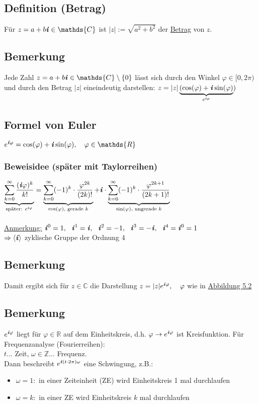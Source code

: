 \documentclass[a4paper, 12pt,titlepage, pdf, headsepline]{scrartcl}
\newcommand{\R}{\mathds{R}}
\newcommand{\Z}{\mathds{Z}}
\newcommand{\C}{\mathds{C}}
\newcommand{\uline}[1]{\underline{#1}}
\renewcommand{\i}{\textbf{\textit{i}}}
\renewcommand{\>}{\rightarrow}
\renewcommand{\*}{\cdot}
\renewcommand{\phi}{\varphi}
\begin{document}
		      		\subsection{Definition (Betrag)}
		      		Für $z = a+b\i \in \C$ ist $|z| := \sqrt{a^2 + b^2}$ der \uline{Betrag} von $z$.
		      		\subsection{Bemerkung}
		      		Jede Zahl $z = a+b\i \in \C \setminus \{0\} $ lässt sich durch den Winkel $\phi \in [0,2\pi)$ und durch den Betrag $|z|$ eineindeutig darstellen: 
		      			$z = |z|\underbrace{(\cos(\phi) + \i \sin(\phi)}_{e^{\i\phi}})$
		      			\subsection{Formel von Euler}
		      			\label{5.5}
		      			$e^{\i\phi} = \cos(\phi) + \i \sin(\phi),~~~ \phi \in \R$
		      			\subsubsection*{Beweisidee (später mit Taylorreihen)}
		      			$\underbrace{\sum_{k = 0}^{\infty} \frac{(\i\phi)^k}{k!}}_{\text{später: }e^{\i\phi}} = \underbrace{\sum_{k = 0}^{\infty}(-1)^k \cdot \frac{\phi^{2k}}{(2k)!}}_{\cos(\phi)\textrm{, gerade }k} + \i \cdot \underbrace{ \sum_{k = 0}^{\infty}(-1)^k \cdot \frac{\phi^{2k+1}}{(2k+1)!}}_{\sin(\phi)\textrm{, ungerade }k}$\\
		      			\\
		      			\uline{Anmerkung:} $\i^0 = 1,~~ \i^1 = \i,~~ \i^2 = -1,~~ \i^3 = -\i,~~ \i^4 = \i^0 = 1$\\
		      			$\Rightarrow \langle \i \rangle$ zyklische Gruppe der Ordnung 4
		      			\subsection{Bemerkung}
		      			Damit ergibt sich für $z \in \C$ die Darstellung $z = |z| e^{\i\phi},~~~ \phi$ wie in \hyperref[5.2]{Abbildung 5.2}
		      			\subsection{Bemerkung}
		      			$e^{\i\phi}$ liegt für $\phi \in \R$ auf dem Einheitskreis, d.h. $\phi \rightarrow e^{\i\phi}$ ist Kreisfunktion. Für Frequenzanalyse (Fourierreihen): \\
		      			$t$... Zeit, $\omega \in \Z$... Frequenz. \\
		      			Dann beschreibt $e^{\i(t \cdot 2\pi) \omega}$ eine Schwingung, z.B.:
		      			\begin{itemize}
		      				\item $\omega = 1:$ in einer Zeiteinheit (ZE) wird Einheitskreis 1 mal durchlaufen
		      				\item $\omega = k:$ in einer ZE wird Einheitskreis $k$ mal durchlaufen
		      			\end{itemize}
\end{document}
